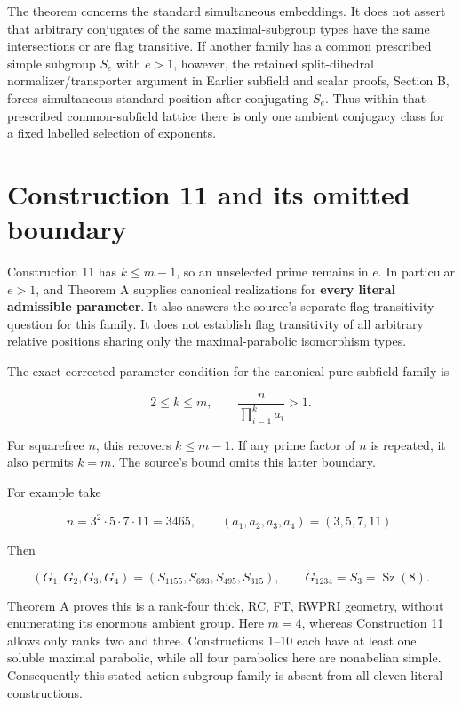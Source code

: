 \documentclass[11pt,a4paper]{article}
\begin{document}
The theorem concerns the standard simultaneous embeddings. It does not
assert that arbitrary conjugates of the same maximal-subgroup types have
the same intersections or are flag transitive. If another family has a
common prescribed simple subgroup \(S_e\) with \(e>1\), however, the
retained split-dihedral normalizer/transporter argument in
Earlier subfield and scalar proofs, Section B, forces simultaneous standard
position after conjugating \(S_e\). Thus within that prescribed
common-subfield lattice there is only one ambient conjugacy class for a
fixed labelled selection of exponents.

\section{Construction 11 and its omitted
boundary}\label{construction-11-and-its-omitted-boundary}

Construction 11 has \(k\le m-1\), so an unselected prime remains in
\(e\). In particular \(e>1\), and Theorem A supplies canonical
realizations for \textbf{every literal admissible parameter}. It also
answers the source's separate flag-transitivity question for this
family. It does not establish flag transitivity of all arbitrary
relative positions sharing only the maximal-parabolic isomorphism types.

The exact corrected parameter condition for the canonical pure-subfield
family is

\[
 2\le k\le m,\qquad \frac{n}{\prod_{i=1}^k a_i}>1.
\tag{1}
\]

For squarefree \(n\), this recovers \(k\le m-1\). If any prime factor of
\(n\) is repeated, it also permits \(k=m\). The source's bound omits
this latter boundary.

For example take

\[
 n=3^2\cdot5\cdot7\cdot11=3465,\qquad
 (a_1,a_2,a_3,a_4)=(3,5,7,11).
\]

Then

\[
 (G_1,G_2,G_3,G_4)
 =(S_{1155},S_{693},S_{495},S_{315}),\qquad
 G_{1234}=S_3=\operatorname{Sz}(8).
\]

Theorem A proves this is a rank-four thick, RC, FT, RWPRI geometry,
without enumerating its enormous ambient group. Here \(m=4\), whereas
Construction 11 allows only ranks two and three. Constructions 1--10
each have at least one soluble maximal parabolic, while all four
parabolics here are nonabelian simple. Consequently this stated-action
subgroup family is absent from all eleven literal constructions.
\end{document}
